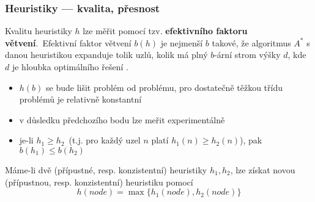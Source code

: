 \documentclass[red,handout,professionalfont]{beamer}
\theoremstyle{definition}
\newcommand{\0}{\mbox{${\bf 0}$}}
\renewcommand{\emph}[1]{{\bf #1}}
\begin{document}
\begin{frame}\frametitle{Heuristiky --- kvalita, přesnost}

Kvalitu heuristiky $h$ lze měřit pomocí tzv. \emph{efektivního faktoru větvení}.\pause\ Efektivní faktor větvení $b(h)$ je nejmenší $b$ takové\pause, že
algoritmus $A^*$ s danou heuristikou expanduje tolik uzlů\pause, kolik má plný $b$-ární strom výšky $d$\pause, kde $d$ je hloubka optimálního řešení \pause.

\begin{itemize}
 \item $h(b)$ se bude lišit problém od problému\pause, pro dostatečně těžkou třídu problémů je relativně konstantní\pause
 \item v důsledku předchozího bodu lze meřit experimentálně\pause
 \item je-li $h_1\geq h_2$\pause\ (t.j. pro každý uzel $n$ platí $h_1(n)\geq h_2(n)$)\pause, pak $b(h_1)\leq b(h_2)$\pause
\end{itemize}

Máme-li dvě (přípustné, resp. konzistentní) heuristiky $h_1,h_2$\pause, lze získat novou (přípustnou, resp. konzistentní) heuristiku pomocí
\begin{displaymath}
 h(node) = \max\{h_1(node),h_2(node)\}
\end{displaymath}


\end{frame}
\end{document}
